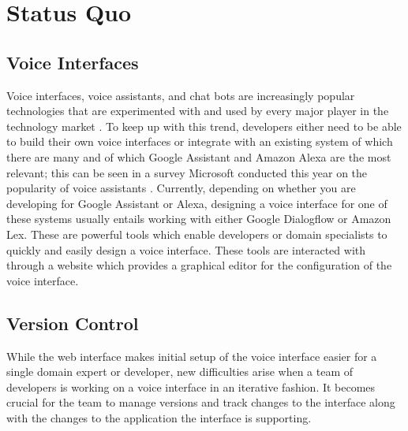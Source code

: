 \chapter{Status Quo}
\section{Voice Interfaces}
Voice interfaces, voice assistants, and chat bots are increasingly popular technologies \cite[page 8]{Olson2019} that are experimented with and used by every major player in the technology market \cite{Chatbots2018}. To keep up with this trend, developers either need to be able to build their own voice interfaces or integrate with an existing system of which there are many \cite{Alternativeto2019} and of which Google Assistant and Amazon Alexa are the most relevant; this can be seen in a survey Microsoft conducted this year on the popularity of voice assistants \cite[page 9]{Olson2019}.
Currently, depending on whether you are developing for Google Assistant or Alexa, designing a voice interface for one of these systems usually entails working with either Google Dialogflow or Amazon Lex. These are powerful tools which enable developers or domain specialists to quickly and easily design a voice interface.
These tools are interacted with through a website which provides a graphical editor for the configuration of the voice interface. 

\section{Version Control}
While the web interface makes initial setup of the voice interface easier for a single domain expert or developer, new difficulties arise when a team of developers is working on a voice interface in an iterative fashion. It becomes crucial for the team to manage versions and track changes to the interface along with the changes to the application the interface is supporting. 

